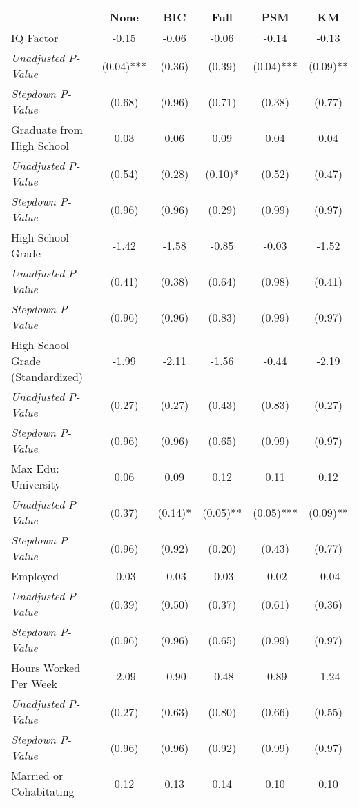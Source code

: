 \begin{tabular}{l c c c c c}
\toprule
 & None & BIC & Full & PSM & KM \\
\midrule
IQ Factor & -0.15 & -0.06 & -0.06 & -0.14 & -0.13 \\
\quad \textit{Unadjusted P-Value} & (0.04)*** & (0.36) & (0.39) & (0.04)*** & (0.09)** \\
\quad \textit{Stepdown P-Value} & (0.68) & (0.96) & (0.71) & (0.38) & (0.77) \\
Graduate from High School & 0.03 & 0.06 & 0.09 & 0.04 & 0.04 \\
\quad \textit{Unadjusted P-Value} & (0.54) & (0.28) & (0.10)* & (0.52) & (0.47) \\
\quad \textit{Stepdown P-Value} & (0.96) & (0.96) & (0.29) & (0.99) & (0.97) \\
High School Grade & -1.42 & -1.58 & -0.85 & -0.03 & -1.52 \\
\quad \textit{Unadjusted P-Value} & (0.41) & (0.38) & (0.64) & (0.98) & (0.41) \\
\quad \textit{Stepdown P-Value} & (0.96) & (0.96) & (0.83) & (0.99) & (0.97) \\
High School Grade (Standardized) & -1.99 & -2.11 & -1.56 & -0.44 & -2.19 \\
\quad \textit{Unadjusted P-Value} & (0.27) & (0.27) & (0.43) & (0.83) & (0.27) \\
\quad \textit{Stepdown P-Value} & (0.96) & (0.96) & (0.65) & (0.99) & (0.97) \\
Max Edu: University & 0.06 & 0.09 & 0.12 & 0.11 & 0.12 \\
\quad \textit{Unadjusted P-Value} & (0.37) & (0.14)* & (0.05)** & (0.05)*** & (0.09)** \\
\quad \textit{Stepdown P-Value} & (0.96) & (0.92) & (0.20) & (0.43) & (0.77) \\
Employed & -0.03 & -0.03 & -0.03 & -0.02 & -0.04 \\
\quad \textit{Unadjusted P-Value} & (0.39) & (0.50) & (0.37) & (0.61) & (0.36) \\
\quad \textit{Stepdown P-Value} & (0.96) & (0.96) & (0.65) & (0.99) & (0.97) \\
Hours Worked Per Week & -2.09 & -0.90 & -0.48 & -0.89 & -1.24 \\
\quad \textit{Unadjusted P-Value} & (0.27) & (0.63) & (0.80) & (0.66) & (0.55) \\
\quad \textit{Stepdown P-Value} & (0.96) & (0.96) & (0.92) & (0.99) & (0.97) \\
Married or Cohabitating & 0.12 & 0.13 & 0.14 & 0.10 & 0.10 \\

\end{tabular}
